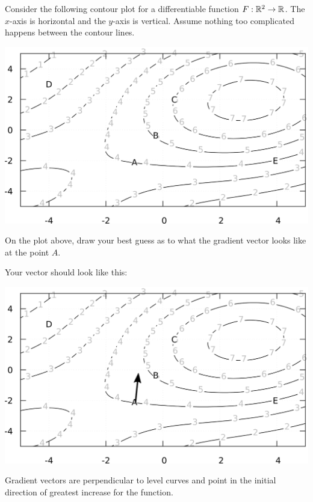 \documentclass{ximera}
\author{Jim Fowler and Bart Snapp}
\begin{document}
Consider the following contour plot for a differentiable function $F :
\mathbb R^2 \to \mathbb R$.  The $x$-axis is horizontal and the $y$-axis is
vertical.  Assume nothing too complicated happens between the contour
lines.
\begin{image}[6in]
\includegraphics{contourPlot.png}
\end{image}

\begin{problem}
On the plot above, draw your best guess as to what the gradient vector looks like at the point $A$.
\begin{prompt}
  \begin{multipleChoice}
\end{multipleChoice}
  \begin{feedback}
    Your vector should look like this:
    \begin{image}
      \includegraphics{contourWithGrad.png}
    \end{image}
    Gradient vectors are perpendicular to level curves and point in the initial direction of greatest increase for the function.
  \end{feedback}
\end{prompt}

\vfill

\end{problem}
\end{document}
